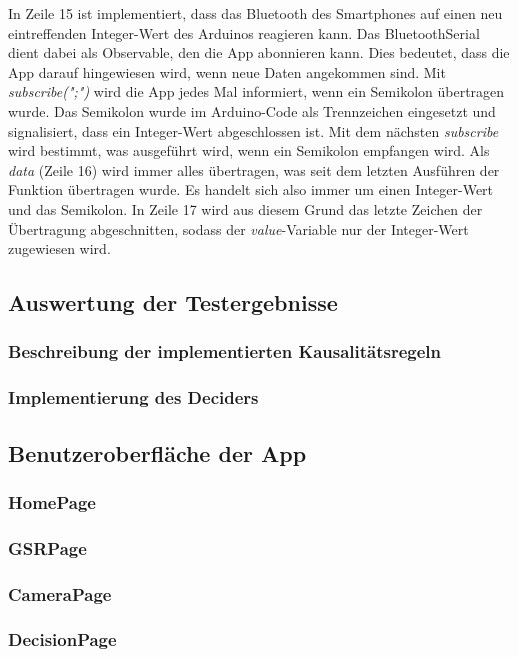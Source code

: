 In Zeile 15 ist implementiert, dass das Bluetooth des Smartphones auf einen neu eintreffenden Integer-Wert des Arduinos reagieren kann. Das BluetoothSerial dient dabei als Observable, den die App abonnieren kann. Dies bedeutet, dass die App darauf hingewiesen wird, wenn neue Daten angekommen sind. Mit \textit{subscribe(";")} wird die App jedes Mal informiert, wenn ein Semikolon übertragen wurde. Das Semikolon wurde im Arduino-Code als Trennzeichen eingesetzt und signalisiert, dass ein Integer-Wert abgeschlossen ist. Mit dem nächsten \textit{subscribe} wird bestimmt, was ausgeführt wird, wenn ein Semikolon empfangen wird. Als \textit{data} (Zeile 16) wird immer alles übertragen, was seit dem letzten Ausführen der Funktion übertragen wurde. Es handelt sich also immer um einen Integer-Wert und das Semikolon. In Zeile 17 wird aus diesem Grund das letzte Zeichen der Übertragung abgeschnitten, sodass der \textit{value}-Variable nur der Integer-Wert zugewiesen wird.

\subsection{Auswertung der Testergebnisse}
\subsubsection{Beschreibung der implementierten Kausalitätsregeln}
\subsubsection{Implementierung des Deciders}
\subsection{Benutzeroberfläche der App}
\subsubsection{HomePage}
\subsubsection{GSRPage}
\subsubsection{CameraPage}
\subsubsection{DecisionPage}
